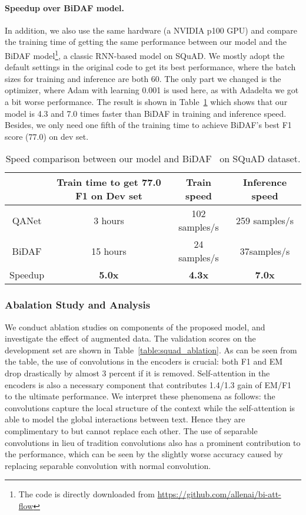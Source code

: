 \documentclass{article} \usepackage{iclr2018_conference,times}
\begin{document}
\paragraph{Speedup over BiDAF model.}
In addition, we also use the same hardware (a NVIDIA p100 GPU) and compare the training time of getting the same performance between our model and the BiDAF model\footnote{The code is directly downloaded from \url{https://github.com/allenai/bi-att-flow}}\citep{SeoKFH16}, a classic RNN-based model on SQuAD. We mostly adopt the default settings in the original code to get its best performance, where the batch sizes for training and inference are both 60. The only part we changed is the optimizer, where Adam with learning 0.001 is used here, as with Adadelta we got a bit worse performance. The result is shown in Table~\ref{table:squad_vs_bidaf} which shows that our model is 4.3 and 7.0 times faster than BiDAF in training and inference speed. Besides, we only need one fifth of the training time to achieve BiDAF's best F1 score ($77.0$) on dev set.

\begin{table}[h!]
\small
\begin{center}
\begin{tabular}{c|c|c|c}
\hline &  Train time to get 77.0 F1 on Dev set& Train speed & Inference speed\\\hline 
QANet & 3 hours& 102  samples/s & 259 samples/s \\
BiDAF& 15 hours &  24 samples/s &  37samples/s\\\hline
Speedup & \textbf{5.0x} & \textbf{4.3x} & \textbf{7.0x}
\\\hline \end{tabular}
\end{center}
\caption{Speed comparison between our model and BiDAF~\citep{SeoKFH16} on SQuAD dataset.}
\label{table:squad_vs_bidaf}
 \end{table}


\subsubsection{Abalation Study and Analysis}
We conduct ablation studies on components of the proposed model, and investigate the  effect of augmented data. The validation scores on the development set are shown in Table~\ref{table:squad_ablation}. As can be seen from the table, the use of convolutions in the encoders is crucial: both F1 and EM drop drastically by almost 3 percent if it is removed. Self-attention in the encoders is also a necessary component that contributes 1.4/1.3 gain of EM/F1 to the ultimate performance. We interpret these phenomena as follows: the convolutions capture the local structure of the context while the self-attention is able to model the global interactions between text.
Hence they are complimentary to but cannot replace each other. The use of separable convolutions in lieu of tradition convolutions also has a prominent contribution to the performance, which can be seen by the slightly worse accuracy caused by replacing separable convolution with normal convolution. 
\end{document}
